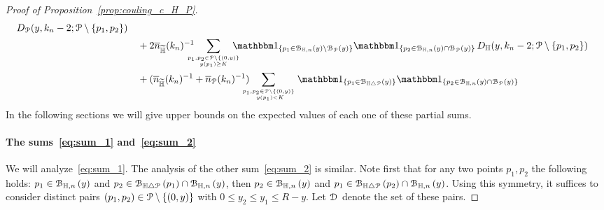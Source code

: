 \begin{proof}[Proof of Proposition~\ref{prop:couling_c_H_P}]
\begin{align}
	\, D_\Pcal (y,k_n-2;\Pcal \setminus \{ p_1,p_2\}) \label{eq:sum_3} \\
&\hspace{10pt}+ 2 \expH^{-1} \hspace{-10pt} \sum_{p_1,p_2 \in\Pcal \setminus \{(0,y)\} 
	\atop y(p_1) \geq K} \hspace{-10pt} \ind{p_1\in \BallHyp{y}\setminus \BallPo{y}} \ind{p_2\in \BallHyp{y}\cap \BallPo{y}} 
	\, D_\H (y,k_n-2;\Pcal \setminus \{ p_1,p_2\}) \label{eq:sum_5}\\
&\hspace{10pt}+ (\expH^{-1} + \expP^{-1}) \hspace{-10pt} \sum_{p_1,p_2 \in\Pcal \setminus \{(0,y)\} \atop \ y(p_1) < K}
	\ind{p_1\in \BallSym{y}} \ind{p_2\in \BallHyp{y}\cap \BallPo{y}} \label{eq:sum_6}
\end{align}
In the following sections we will give upper bounds on the expected values of each one of these partial sums. 

\paragraph{The sums~\eqref{eq:sum_1} and~\eqref{eq:sum_2}}

We will analyze~\eqref{eq:sum_1}. The analysis of the other sum~\eqref{eq:sum_2} is similar.
Note first that for any two points $p_1,p_2$ the following holds: $p_1 \in {\mathcal B}_{\mathbb{H},n}\left(y\right)$ and $p_2 \in {\mathcal B}_{\mathbb{H} \bigtriangleup {\mathcal P}}\left(p_1\right)\cap {\mathcal B}_{\mathbb{H},n}\left(y\right)$, then $p_2 \in {\mathcal B}_{\mathbb{H},n}\left(y\right)$ and $p_1 \in {\mathcal B}_{\mathbb{H} \bigtriangleup {\mathcal P}}\left(p_2\right)\cap {\mathcal B}_{\mathbb{H},n}\left(y\right)$.
Using this symmetry, it suffices to consider distinct pairs $(p_1,p_2) \in {\mathcal P} \setminus \{(0,y)\}$ with $0\leq y_2 \leq y_1 \leq R- y$. Let $\mathcal{D}_{}$ denote the set of these pairs. 


\end{proof}
